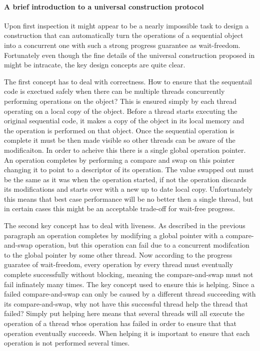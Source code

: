 %
%


\paragraph{A brief introduction to a universal construction protocol}
Upon first inspection it might appear to be a nearly impossible task to design
a construction that can automatically turn the operations of a sequential
object into a concurrent one with such a strong progress guarantee as wait-freedom.
Fortunately even though the fine details of the universal construction proposed
in \cite{H91} might be intracate, the key design concepts are quite clear.

The first concept has to deal with correctness.
How to ensure that the sequentail code is exectued safely when there
can be multiple threads concurrently performing operations on the object?
This is ensured simply by each thread operating on a local copy of the object.
Before a thread starts executing the original sequential code, it makes a copy
of the object in its local memory and the operation is performed on that object.
Once the sequential operation is complete it must be then made visible so other
threads can be aware of the modificaiton.
In order to acheive this there is a single global operation pointer.
An operation completes by performing a compare and swap on this pointer
changing it to point to a descriptor of its operation.
The value swapped out must be the same as it was when the operation started,
if not the operation discards its modifications and starts over with a
new up to date local copy.
Unfortunately this means that best case performance will be no better
then a single thread, but in certain cases this might be an acceptable
trade-off for wait-free progress.

The second key concept has to deal with liveness.
As described in the previous paragraph an operation completes by
modifying a global pointer with a compare-and-swap operation,
but this operation can fail due to a concurrent modifcation
to the global pointer by some other thread.
Now according to the progress guaratee of wait-freedom, every operation
by every thread must eventually complete successfully without blocking,
meaning the compare-and-swap must not fail infinately many times.
The key concept used to ensure this is helping.
Since a failed compare-and-swap can only be caused by a different thread
succeeding with its compare-and-swap, why not have this successful
thread help the thread that failed?
Simply put helping here means that several threads will all execute
the operation of a thread whos operation has failed in order to ensure
that that operation eventually succeeds.
When helping it is important to ensure
that each operation is not performed several times.

